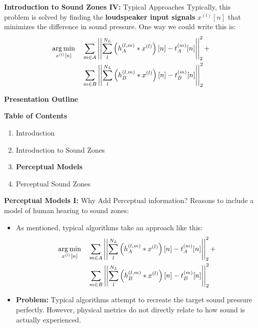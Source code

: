 \documentclass[aspectratio=169]{beamer}
\begin{document}
\begin{frame}{\textbf{Introduction to Sound Zones IV:} Typical Approaches}
    Typically, this problem is solved by finding the \textbf{loudspeaker input signals} $x^{(l)}[n]$ that minimizes the difference in sound pressure.
    One way we could write this is: 
    \begin{align*}
        \argmin{x^{(l)}[n]}{
            & \sum_{m\in A} \norm[2][2]{\sum_l^{N_L} \left(h_A^{(l,m)} \ast x^{(l)}\right)[n] - t_A^{(m)}[n]} + \\
            & \sum_{m\in B} \norm[2][2]{\sum_l^{N_L} \left(h_B^{(l,m)} \ast x^{(l)}\right)[n] - t_B^{(m)}[n] } 
        }
    \end{align*}
\end{frame}

\begin{frame}{\textbf{Presentation Outline}}
    \begin{block}{\textbf{Table of Contents}}
        \begin{enumerate}
            \item Introduction
            \item Introduction to Sound Zones
            \item \textbf{Perceptual Models} 
            \item Perceptual Sound Zones
        \end{enumerate} 
    \end{block}
\end{frame}

\begin{frame}{\textbf{Perceptual Models I:} Why Add Perceptual information?}
    Reasons to include a model of human hearing to sound zones:
    \begin{itemize}
        \item As mentioned, typical algorithms take an approach like this:
            \begin{align*}
                \argmin{x^{(l)}[n]}{
            & \sum_{m\in A} \norm[2][2]{\sum_l^{N_L} \left(h_A^{(l,m)} \ast x^{(l)}\right)[n] - t_A^{(m)}[n]} + \\
            & \sum_{m\in B} \norm[2][2]{\sum_l^{N_L} \left(h_B^{(l,m)} \ast x^{(l)}\right)[n] - t_B^{(m)}[n] }}
            \end{align*}

        \item \textbf{Problem:} Typical algorithms attempt to recreate the target sound pressure perfectly. 
            However, physical metrics do not directly relate to how sound is actually experienced.
    \end{itemize}
\end{frame}
\end{document}
